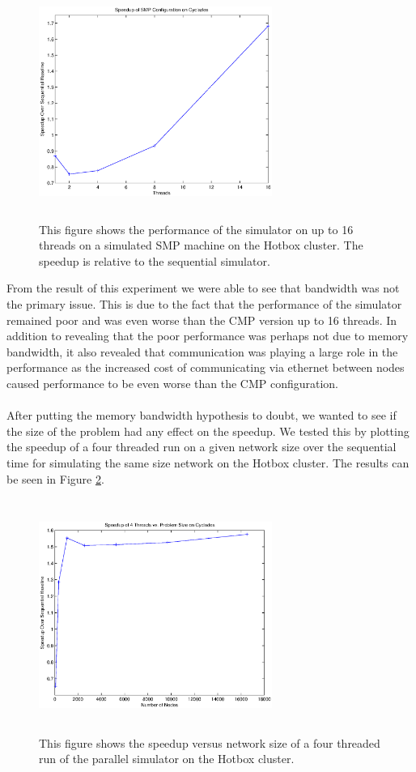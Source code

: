 \documentclass[twocolumn]{article}
\begin{document}
\begin{figure}[h]
\centering
\includegraphics[height=3in,width=3in]{smp.eps}
\caption{\label{smp}This figure shows the performance of the simulator on
up to 16 threads on a simulated SMP machine on the Hotbox cluster.  The speedup is relative to
the sequential simulator.}
\end{figure}
From the result of this experiment we were able to see that bandwidth was
not the primary issue.  This is due to the fact that the performance of
the simulator remained poor and was even worse than the CMP version up to
16 threads.  In addition to revealing that the poor performance was perhaps not
due to memory bandwidth, it also revealed that communication was playing a
large role in the performance as the increased cost of communicating via
ethernet between nodes caused performance to be even worse than the CMP
configuration.\\
~\\
After putting the memory bandwidth hypothesis to doubt, we wanted to see if
the size of the problem had any effect on the speedup.  We tested this by
plotting the speedup of a four threaded run on a given network size over the
sequential time for simulating the same size network on the Hotbox
cluster.  The results can be seen in Figure \ref{probsize}.
\begin{figure}[h]
\centering
\includegraphics[height=3in,width=3in]{probsize.eps}
\caption{\label{probsize}This figure shows the speedup versus network size of a
four threaded run of the parallel simulator on the Hotbox cluster.}
\end{figure}
\end{document}
